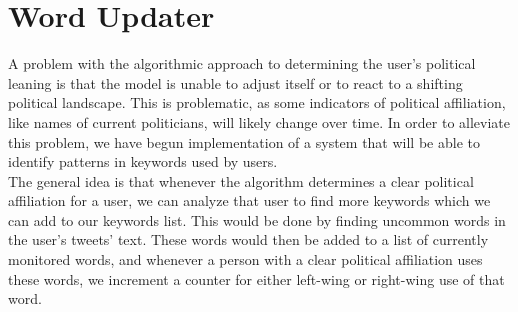 \section{Word Updater}
A problem with the algorithmic approach to determining the user's political
leaning is that the model is unable to adjust itself or to react to a shifting
political landscape. This is problematic, as some indicators of political
affiliation, like names of current politicians, will likely change over time. In
order to alleviate this problem, we have begun implementation of a system that
will be able to identify patterns in keywords used by users.\\ 
The general idea is that whenever the algorithm determines a clear political
affiliation for a user, we can analyze that user to find more keywords which we
can add to our keywords list. This would be done by finding uncommon words in
the user's tweets' text. These words would then be added to a list of currently
monitored words, and whenever a person with a clear political affiliation uses
these words, we increment a counter for either left-wing or right-wing use of
that word. 

% 
% 
% 














